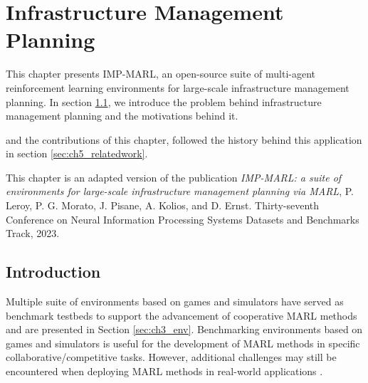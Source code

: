 \chapter{Infrastructure Management Planning}\label{ch:impmarl}

\begin{chapter_outline}

This chapter presents IMP-MARL, an open-source suite of multi-agent reinforcement learning environments for large-scale infrastructure management planning.
In section \ref{sec:ch5_intro}, we introduce the problem behind infrastructure management planning and the motivations behind it.

and the contributions of this chapter, followed the history behind this application in section \ref{sec:ch5_relatedwork}.

This chapter is an adapted version of the publication \citep{leroy2023impmarl} \textit{IMP-MARL: a suite of environments for large-scale infrastructure management planning via MARL}, P. Leroy, P. G. Morato, J. Pisane, A. Kolios, and D. Ernst. Thirty-seventh Conference on Neural Information Processing Systems Datasets and Benchmarks Track, 2023.
\end{chapter_outline}

\section{Introduction}\label{sec:ch5_intro}
Multiple suite of environments based on games and simulators have served as benchmark testbeds to support the advancement of cooperative MARL methods and are presented in Section \ref{sec:ch3_env}.
Benchmarking environments based on games and simulators is useful for the development of MARL methods in specific collaborative/competitive tasks.
However, additional challenges may still be encountered when deploying MARL methods in real-world applications \citep{oroojlooy2022review}.

